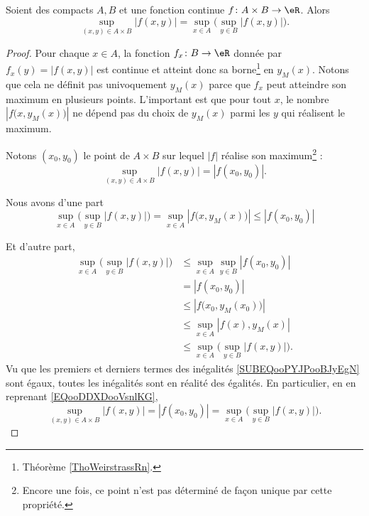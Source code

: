 \begin{lemma}       \label{LEMooQLVAooICaPvR}
    Soient des compacts \( A,B\) et une fonction continue \( f\colon A\times B\to \eR\). Alors
    \begin{equation}
        \sup_{(x,y)\in A\times B}| f(x,y) |=\sup_{x\in A}\big( \sup_{y\in B}| f(x,y) | \big).
    \end{equation}
\end{lemma}

\begin{proof}
    Pour chaque \( x\in A \), la fonction \( f_x\colon B\to \eR\) donnée par \( f_x(y)=| f(x,y) |\) est continue et atteint donc sa borne\footnote{Théorème \ref{ThoWeirstrassRn}.} en \( y_M(x)\). Notons que cela ne définit pas univoquement \( y_M(x)\) parce que \( f_x\) peut atteindre son maximum en plusieurs points. L'important est que pour tout \( x\), le nombre \( | f\big( x,y_M(x) \big) |\) ne dépend pas du choix de \( y_M(x)\) parmi les \( y\) qui réalisent le maximum.


    Notons \( (x_0,y_0)\) le point de \( A\times B\) sur lequel \( | f |\) réalise son maximum\footnote{Encore une fois, ce point n'est pas déterminé de façon unique par cette propriété.} :
    \begin{equation}        \label{EQooDDXDooVsnlKG}
        \sup_{(x,y)\in A\times B}| f(x,y) |=| f(x_0,y_0) |.
    \end{equation}
    

    Nous avons d'une part
    \begin{equation}
        \sup_{x\in A}\big( \sup_{y\in B}| f(x,y) | \big)=\sup_{x\in A}| f\big( x,y_M(x) \big) |\leq | f(x_0,y_0) |
    \end{equation}

    Et d'autre part,
    \begin{subequations}        \label{SUBEQooPYJPooBJyEgN}
        \begin{align}
            \sup_{x\in A}\big( \sup_{y\in B}| f(x,y) | \big)&\leq \sup_{x\in A}\sup_{y\in B}| f(x_0,y_0) |\\
            &=| f(x_0,y_0) |\\
            &\leq | f\big(x_0,y_M(x_0)\big) |\\
            &\leq \sup_{x\in A}| f(x),y_M(x) |\\
            &\leq \sup_{x\in A}\big( \sup_{y\in B}| f(x,y) | \big).
        \end{align}
    \end{subequations}
    Vu que les premiers et derniers termes des inégalités \eqref{SUBEQooPYJPooBJyEgN} sont égaux, toutes les inégalités sont en réalité des égalités. En particulier, en en reprenant \eqref{EQooDDXDooVsnlKG},
    \begin{equation}
        \sup_{(x,y)\in A\times B}| f(x,y) |=| f(x_0,y_0) |=\sup_{x\in A}\big( \sup_{y\in B}| f(x,y) | \big).
    \end{equation}
\end{proof}

